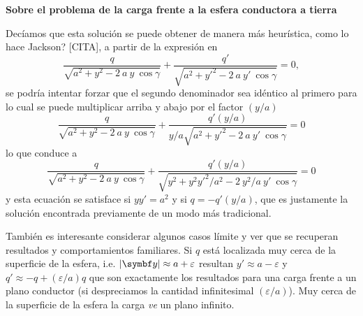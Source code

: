 \documentclass[10pt,oneside]{CBFT_book}
\begin{document}
\begin{notasfinales}

\label{notas_carga_frente_a_esfera}
\item{ \bf Sobre el problema de la carga frente a la esfera conductora a tierra}

Decíamos que esta solución se puede obtener de manera más heurística, como lo hace Jackson? [CITA],
a partir de la expresión en 
\[
	\frac{q}{\sqrt{ a^2 + y^2 - 2 \: a \: y \:\cos{\gamma}} } +
	\frac{q'}{\sqrt{ a^2 + y'^2 - 2 \: a \: y' \: \cos{\gamma} }} = 0,
\]
se podría intentar forzar que el segundo denominador sea idéntico al primero para lo cual se puede multiplicar
arriba y abajo por el factor $(y/a) $
\[
	\frac{q}{\sqrt{ a^2 + y^2 - 2 \: a \: y \:\cos{\gamma}} } +
	\frac{q' (y/a) }{ y/a \sqrt{ a^2 + y'^2 - 2 \: a \: y' \: \cos{\gamma} }} = 0
\]
lo que conduce a
\[
	\frac{q}{\sqrt{ a^2 + y^2 - 2 \: a \: y \:\cos{\gamma}} } +
	\frac{q' (y/a) }{\sqrt{ y^2 + y^2y'^2/a^2 - 2 \: y^2/a \: y' \: \cos{\gamma} }} = 0
\]
y esta ecuación se satisface si $ y y'= a^2 $ y si $ q = - q' (y/a)$, que es justamente la solución
encontrada previamente de un modo más tradicional.

También es interesante considerar algunos casos límite y ver que se recuperan resultados y comportamientos
familiares. Si $ q $ está localizada muy cerca de la superficie de la esfera, i.e. $ |\vb{y}| \approx a + \varepsilon $
resultan $ y' \approx a - \varepsilon $ y $ q' \approx -q + ( \varepsilon / a ) q $ que son exactamente los
resultados para una carga frente a un plano conductor (si despreciamos la cantidad infinitesimal $( \varepsilon / a )$).
Muy cerca de la superficie de la esfera la carga {\it ve} un plano infinito.


\end{notasfinales}


\end{document}
